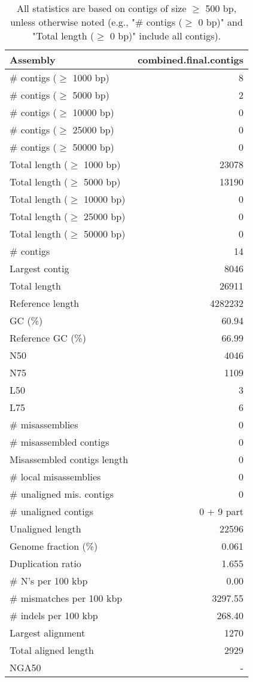 \documentclass[12pt,a4paper]{article}
\begin{document}
\begin{table}[ht]
\begin{center}
\caption{All statistics are based on contigs of size $\geq$ 500 bp, unless otherwise noted (e.g., "\# contigs ($\geq$ 0 bp)" and "Total length ($\geq$ 0 bp)" include all contigs).}
\begin{tabular}{|l*{1}{|r}|}
\hline
Assembly & combined.final.contigs \\ \hline
\# contigs ($\geq$ 1000 bp) & 8 \\ \hline
\# contigs ($\geq$ 5000 bp) & 2 \\ \hline
\# contigs ($\geq$ 10000 bp) & 0 \\ \hline
\# contigs ($\geq$ 25000 bp) & 0 \\ \hline
\# contigs ($\geq$ 50000 bp) & 0 \\ \hline
Total length ($\geq$ 1000 bp) & 23078 \\ \hline
Total length ($\geq$ 5000 bp) & 13190 \\ \hline
Total length ($\geq$ 10000 bp) & 0 \\ \hline
Total length ($\geq$ 25000 bp) & 0 \\ \hline
Total length ($\geq$ 50000 bp) & 0 \\ \hline
\# contigs & 14 \\ \hline
Largest contig & 8046 \\ \hline
Total length & 26911 \\ \hline
Reference length & 4282232 \\ \hline
GC (\%) & 60.94 \\ \hline
Reference GC (\%) & 66.99 \\ \hline
N50 & 4046 \\ \hline
N75 & 1109 \\ \hline
L50 & 3 \\ \hline
L75 & 6 \\ \hline
\# misassemblies & 0 \\ \hline
\# misassembled contigs & 0 \\ \hline
Misassembled contigs length & 0 \\ \hline
\# local misassemblies & 0 \\ \hline
\# unaligned mis. contigs & 0 \\ \hline
\# unaligned contigs & 0 + 9 part \\ \hline
Unaligned length & 22596 \\ \hline
Genome fraction (\%) & 0.061 \\ \hline
Duplication ratio & 1.655 \\ \hline
\# N's per 100 kbp & 0.00 \\ \hline
\# mismatches per 100 kbp & 3297.55 \\ \hline
\# indels per 100 kbp & 268.40 \\ \hline
Largest alignment & 1270 \\ \hline
Total aligned length & 2929 \\ \hline
NGA50 & - \\ \hline
\end{tabular}
\end{center}
\end{table}
\end{document}

